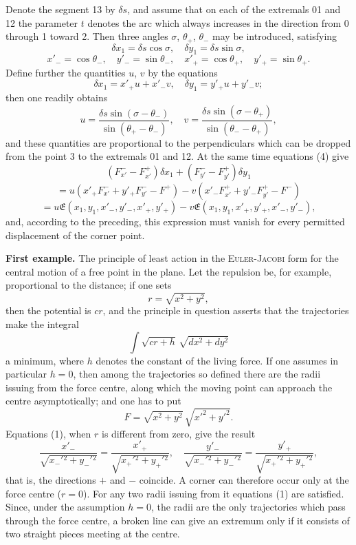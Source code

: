 \documentclass[11pt,a4paper,leqno]{article}
\begin{document}
Denote the segment 13 by $\delta s$, and assume that on each of the extremals 01 and 12 the parameter $t$ denotes the arc which always increases in the direction from 0 through 1 toward 2. Then three angles $\sigma$, $\theta_+$, $\theta_-$ may be introduced, satisfying
\[
\delta x_1=\delta s\cos\sigma,\quad \delta y_1=\delta s\sin\sigma,
\]
\[
x'_{-}=\cos\theta_{-},\quad y'_{-}=\sin\theta_{-},\quad
x'_{+}=\cos\theta_{+},\quad y'_{+}=\sin\theta_{+}.
\]
Define further the quantities $u$, $v$ by the equations
\begin{equation}\tag{4}
\delta x_1=x'_{+}u+x'_{-}v,
\quad \delta y_1=y'_{+}u+y'_{-}v;
\end{equation}
then one readily obtains
\[
u=\frac{\delta s\sin(\sigma-\theta_{-})}{\sin(\theta_{+}-\theta_{-})},
\quad
v=\frac{\delta s\sin(\sigma-\theta_{+})}{\sin(\theta_{-}-\theta_{+})},
\]
and these quantities are proportional to the perpendiculars which can be dropped from the point 3 to the extremals 01 and 12. At the same time equations (4) give
\[
(F_{x'}^- -F_{x'}^+)\delta x_1+(F_{y'}^- -F_{y'}^+)\delta y_1
\]
\[
=u(x'_{+}F_{x'}^-+y'_{+}F_{y'}^- -F^+)-v(x'_{-}F_{x'}^+ + y'_{-}F_{y'}^+ -F^-)
\]
\[
=u\mathfrak{E}(x_1,y_1,x'_{-},y'_{-},x'_{+},y'_{+})
-v\mathfrak{E}(x_1,y_1,x'_{+},y'_{+},x'_{-},y'_{-}),
\]
and, according to the preceding, this expression must vanish for every permitted displacement of the corner point.

\textbf{First example.} The principle of least action in the \textsc{Euler-Jacobi} form for the central motion of a free point in the plane. Let the repulsion be, for example, proportional to the distance; if one sets
\[
r=\sqrt{x^2+y^2},
\]
then the potential is $cr$, and the principle in question asserts that the trajectories make the integral
\[
\int \sqrt{cr+h}\,\sqrt{dx^2+dy^2}
\]
a minimum, where $h$ denotes the constant of the living force. If one assumes in particular $h=0$, then among the trajectories so defined there are the radii issuing from the force centre, along which the moving point can approach the centre asymptotically; and one has to put
\[
F=\sqrt{x^2+y^2}\,\sqrt{x'^2+y'^2}.
\]
Equations (1), when $r$ is different from zero, give the result
\[
\frac{x'_{-}}{\sqrt{x_{-}'{}^2+y_{-}'{}^2}}
=
\frac{x'_{+}}{\sqrt{x_{+}'{}^2+y_{+}'{}^2}},
\quad
\frac{y'_{-}}{\sqrt{x_{-}'{}^2+y_{-}'{}^2}}
=
\frac{y'_{+}}{\sqrt{x_{+}'{}^2+y_{+}'{}^2}},
\]
that is, the directions $+$ and $-$ coincide. A corner can therefore occur only at the force centre ($r=0$). For any two radii issuing from it equations (1) are satisfied. Since, under the assumption $h=0$, the radii are the only trajectories which pass through the force centre, a broken line can give an extremum only if it consists of two straight pieces meeting at the centre.
\end{document}
